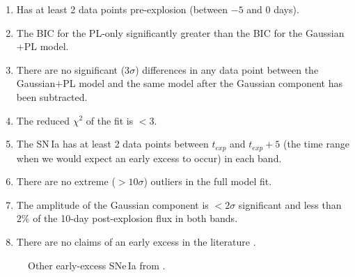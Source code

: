 \documentclass[twocolumn,twocolappendix, linenumbers]{aastex631} %
\begin{document}
\begin{enumerate}
    \item Has at least 2 data points pre-explosion (between $-5$ and 0 days).
    
    \item The BIC for the PL-only  significantly greater than the BIC for the Gaussian$+$PL model.
    
    \item There are no significant (3$\sigma$) differences in any data point between the Gaussian$+$PL model and the same model after the Gaussian component has been subtracted.
    
    \item The reduced $\chi^2$ of the fit is $< 3$.
    
    \item The SN\,Ia has at least 2 data points between $t_{exp}$ and $t_{exp}+5$ (the time range when we would expect an early excess to occur) in each band.
    
    
    \item There are no extreme ($>10\sigma$) outliers in the full model fit.
    
    \item The amplitude of the Gaussian component is $<2\sigma$ significant and less than $2\%$ of the 10-day post-explosion flux in both bands.
    
    
    \item There are no claims of an early excess in the literature \citep[e.g.,][]{Yao19,Bulla20,Miller20,Deckers22,Burke22b}.
    
\end{enumerate}

\begin{figure}
  \centering 
         \hfill
    \centering
        \hfill
    \centering
         \hfill
    \centering
         \hfill
     \hfill
     \centering
         \hfill
    \centering
         \hfill
     \hfill
     
  \caption{Other early-excess SNe\,Ia from \citet{Yao19}.}
  \label{fig:cont1}
\end{figure}
\end{document}
